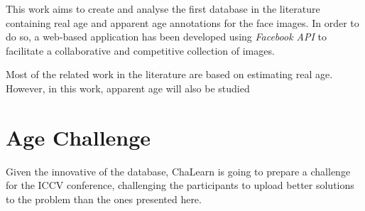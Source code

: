 This work aims to create and analyse  the first database in the literature containing real age and apparent age annotations for the face images. In order to do so, a web-based application has been developed using \textit{Facebook API} to facilitate a collaborative and competitive collection of images.


Most of the related work in the literature are based on estimating real age. However, in this work, apparent age will also be studied

\section{Age Challenge}

Given the innovative of the database, ChaLearn is going to prepare a challenge for the ICCV conference, challenging the participants to upload better solutions to the problem than the ones presented here.
